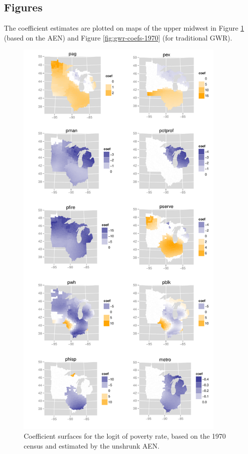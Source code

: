 \documentclass[authoryear, review, 11pt]{elsarticle}
\begin{document}
	\subsection{Figures}
	The coefficient estimates are plotted on maps of the upper midwest in Figure \ref{fig:unshrunk-enet-coefs-1970} (based on the AEN) and Figure \ref{fig:gwr-coefs-1970} (for traditional GWR).
	\begin{figure}
		\begin{center}
			\includegraphics[height=8in]{../../figures/poverty/1970-linear-coefficients-unshrunk.pdf}
			\caption{Coefficient surfaces for the logit of poverty rate, based on the 1970 census and estimated by the unshrunk AEN. \label{fig:unshrunk-enet-coefs-1970}}
		\end{center}
	\end{figure}	
	
\end{document}
